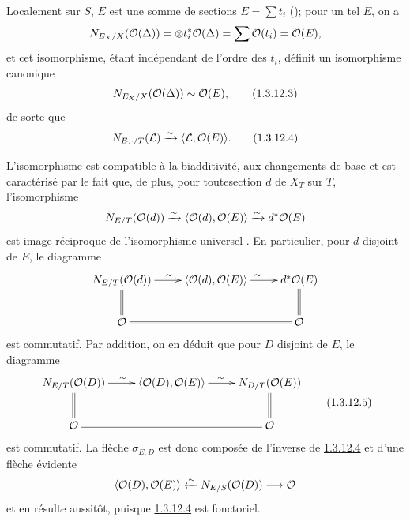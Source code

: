 \documentclass[10pt]{../fichiers-configuration-latex/smfart}
\begin{document}
Localement sur $S$, $E$ est une somme de sections $E=\sum t_{i}$
(); pour un tel $E$, on a
$$
N_{E_{X}/X}({\mathcal O}(\Delta))=\otimes
t^{\ast}_{i}{\mathcal O}(\Delta)=\sum{\mathcal O}(t_{i})={\mathcal O}(E){},
$$
et cet isomorphisme, étant indépendant de l'ordre des $t_{i}$, définit
un isomorphisme canonique
\begin{equation*}
N_{E_{X}/X}({\mathcal O}(\Delta))\sim {\mathcal O}(E){},\tag{1.3.12.3}
\end{equation*}%
de sorte que
\begin{equation*}
N_{E_{T}/T}(\Ll)\xrightarrow{\sim}\langle \Ll,\Oo(E)\rangle{\quoi}.%
\tag{1.3.12.4}
\end{equation*}

L'isomorphisme  est compatible à la biadditivité, aux
changements de base et est caractérisé par le fait que, de plus, pour
toute\pageoriginale section $d$ de $X_{T}$ sur $T$, l'isomorphisme
$$
N_{E/T}({\mathcal O}(d))\xrightarrow{\sim}\langle {\mathcal O}(d),{\mathcal O}(E)\rangle
\xrightarrow{\sim} d^{\ast}{\mathcal O}(E)
$$
est image réciproque de l'isomorphisme universel . En
particulier, pour $d$ disjoint de $E$, le diagramme
$$
\xymatrix{
N_{E/T}(\Oo(d))  \ar[r]^{\sim} \ar@{=}[d]& \langle \Oo(d), \Oo(E)\rangle 
\ar[r]^{\sim} & d^\ast\Oo(E) \ar@{=}[d]\\
\Oo              \ar@{=}[rr] &          & \Oo  
}
$$
est commutatif. Par addition,
on en déduit que pour $D$ disjoint de
$E$, le diagramme
\begin{equation*}
\vcenter{
\xymatrix{
N_{E/T}(\Oo(D))  \ar[r]^{\sim} \ar@{=}[d]& \langle \Oo(D), \Oo(E)\rangle 
\ar[r]^{\sim} & N_{D/T}(\Oo(E)) \ar@{=}[d]\\
\Oo              \ar@{=}[rr] &          & \Oo  
}}\tag{1.3.12.5}
\end{equation*}%
est commutatif. La flèche $\sigma_{E,D}$ est donc composée de
l'inverse de \hyperref[XVIII.eq1.3.12.4]{1.3.12.4} et d'une flèche évidente
$$
\langle {\mathcal O}(D),{\mathcal O}(E)\rangle \xleftarrow{\sim} N_{E/S}({\mathcal O}(D))\longrightarrow
{\mathcal O}
$$
et  en résulte aussitôt, puisque
\hyperref[XVIII.eq1.3.12.4]{1.3.12.4} est fonctoriel.
\end{document}
